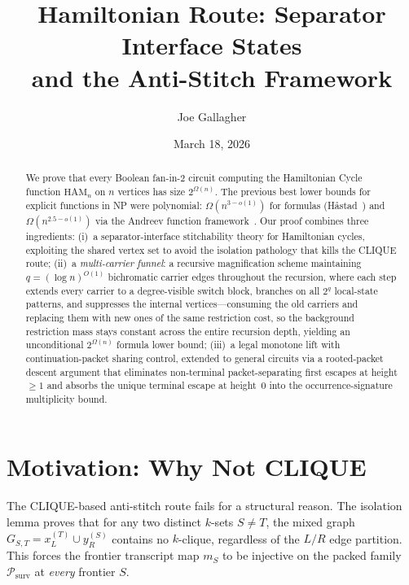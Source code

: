\documentclass[11pt]{article}
\title{Hamiltonian Route: Separator Interface States\\
and the Anti-Stitch Framework}
\author{Joe Gallagher}
\date{March 18, 2026}
\newcommand{\Psurv}{\mathcal{P}_{\mathrm{surv}}}
\begin{document}
\maketitle

\begin{abstract}
We prove that every Boolean fan-in-$2$ circuit computing the Hamiltonian Cycle
function $\mathrm{HAM}_n$ on $n$ vertices has size $2^{\Omega(n)}$.
The previous best lower bounds for explicit functions in NP were polynomial:
$\Omega(n^{3-o(1)})$ for formulas (H\r{a}stad~\cite{Hastad98}) and
$\Omega(n^{2.5-o(1)})$ via the Andreev function framework~\cite{Andreev87}.
Our proof combines three ingredients:
(i)~a separator-interface stitchability theory for Hamiltonian cycles,
exploiting the shared vertex set to avoid the isolation pathology
that kills the CLIQUE route;
(ii)~a \emph{multi-carrier funnel}: a recursive magnification scheme
maintaining $q = (\log n)^{O(1)}$ bichromatic carrier edges throughout
the recursion, where each step extends every carrier to a degree-visible
switch block, branches on all $2^q$ local-state patterns, and suppresses
the internal vertices---consuming the old carriers and replacing them with
new ones of the same restriction cost, so the background restriction mass
stays constant across the entire recursion depth, yielding an unconditional
$2^{\Omega(n)}$ formula lower bound;
(iii)~a legal monotone lift with continuation-packet sharing control,
extended to general circuits via a rooted-packet descent argument
that eliminates non-terminal packet-separating first escapes at
height $\ge 1$ and absorbs the unique terminal escape at height~$0$
into the occurrence-signature multiplicity bound.
\end{abstract}

\section{Motivation: Why Not CLIQUE}
\label{sec:why-not-clique}

The CLIQUE-based anti-stitch route fails for a structural reason.
The isolation lemma proves that for any
two distinct $k$-sets $S \neq T$, the mixed graph
$G_{S,T} = x_L^{(T)} \cup y_R^{(S)}$ contains no $k$-clique,
regardless of the $L/R$ edge partition.
This forces the frontier transcript map $m_S$ to be injective
on the packed family $\Psurv$ at \emph{every} frontier $S$.
\end{document}
